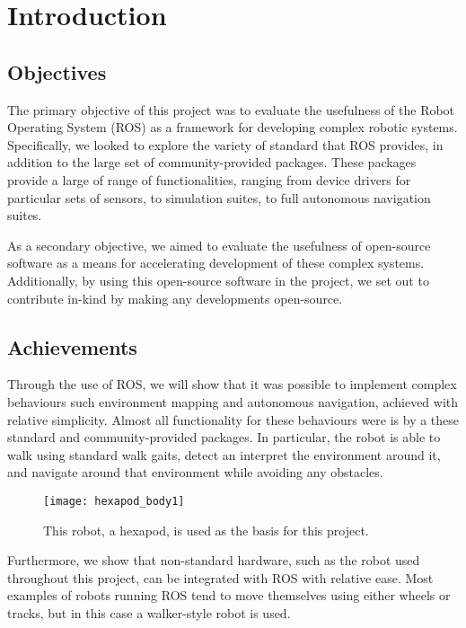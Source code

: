 \chapter{Introduction}


\section{Objectives}

The primary objective of this project was to evaluate the usefulness of the Robot Operating System (ROS) \cite{ros_site} as a framework for developing complex robotic systems. Specifically, we looked to explore the variety of standard that ROS provides, in addition to the large set of community-provided packages. These packages provide a large of range of functionalities, ranging from device drivers for particular sets of sensors, to simulation suites, to full autonomous navigation suites.

As a secondary objective, we aimed to evaluate the usefulness of open-source software as a means for accelerating development of these complex systems. Additionally, by using this open-source software in the project, we set out to contribute in-kind by making any developments open-source.


\section{Achievements}
Through the use of ROS, we will show that it was possible to implement complex behaviours such environment mapping and autonomous navigation, achieved with relative simplicity. Almost all functionality for these behaviours were is by a these standard and community-provided packages. In particular, the robot is able to walk using standard walk gaits, detect an interpret the environment around it, and navigate around that environment while avoiding any obstacles.

\begin{figure}[!h]
    \centering
    \texttt{[image: hexapod\_body1]}
    \caption{This robot, a hexapod, is used as the basis for this project.}
\end{figure}

Furthermore, we show that non-standard hardware, such as the robot used throughout this project, can be integrated with ROS with relative ease. Most examples of robots running ROS tend to move themselves using either wheels or tracks, but in this case a walker-style robot is used.